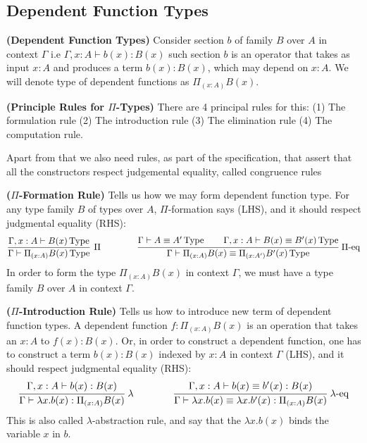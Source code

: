 \subsection{Dependent Function Types}

\begin{definition}{\textbf{(Dependent Function Types)}}
    Consider section $b$ of family $B$ over $A$ in context $\Gamma$ i.e $\Gamma,x:A\vdash b(x):B(x)$ such section $b$ is an operator that takes as input $x:A$ and produces a term $b(x):B(x)$, which may depend on $x:A$. We will denote type of dependent functions as $\Pi_{(x:A)}B(x)$.
\end{definition}

\begin{remark}{\textbf{(Principle Rules for $\Pi$-Types)}}
    There are 4 principal rules for this: (1) The formulation rule (2) The introduction rule (3) The elimination rule (4) The computation rule. 
    
    Apart from that we also need rules, as part of the specification, that assert that all the constructors respect judgemental equality, called congruence rules
\end{remark}

\begin{definition}{\textbf{($\Pi$-Formation Rule)}}
    Tells us how we may form dependent function type. For any type family $B$ of types over $A$, $\Pi$-formation says (LHS), and it should respect judgmental equality (RHS):
    \begin{equation*}
        \frac{\Gamma,x:A\vdash B(x)\type }{\Gamma\vdash\Pi_{(x:A)}B(x)\type }\ \Pi
        \qquad\qquad
        \cfrac{\Gamma\vdash A\equiv A'\type  \qquad \Gamma, x:A\vdash B(x)\equiv B'(x)\type }{\Gamma\vdash\Pi_{(x:A)}B(x)\equiv\Pi_{(x:A')}B'(x)\type }\ \Pi\text{-eq}
    \end{equation*}
    In order to form the type $\Pi_{(x:A)}B(x)$ in context $\Gamma$, we must have a type family $B$ over $A$ in context $\Gamma$.
\end{definition}

\begin{definition}{\textbf{($\Pi$-Introduction Rule)}}
    Tells us how to introduce new term of dependent function types. A dependent function $f:\Pi_{(x:A)}B(x)$ is an operation that takes an $x:A$ to $f(x):B(x)$. Or, in order to construct a dependent function, one has to construct a term $b(x):B(x)$ indexed by $x:A$ in context $\Gamma$ (LHS), and it should respect judgmental equality (RHS):
    \begin{equation*}
        \cfrac{\Gamma,x:A\vdash b(x):B(x)}{\Gamma\vdash\lambda x.b(x):\Pi_{(x:A)}B(x)}\ \lambda
        \qquad\qquad 
        \cfrac{\Gamma,x:A\vdash b(x)\equiv b'(x):B(x)}{\Gamma\vdash\lambda x.b(x)\equiv \lambda x.b'(x):\Pi_{(x:A)}B(x)}\ \lambda\text{-eq}
    \end{equation*}
    This is also called $\lambda$-abstraction rule, and say that the $\lambda x.b(x)$ binds the variable $x$ in $b$. 
\end{definition}

